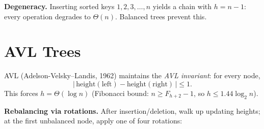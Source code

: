 \textbf{Degeneracy.} Inserting sorted keys $1,2,3,\ldots,n$ yields a chain with $h=n-1$: every operation degrades to $\Theta(n)$. Balanced trees prevent this.

\section{AVL Trees}
\label{sec:avl}
AVL (Adelson-Velsky--Landis, 1962) maintains the \emph{AVL invariant}: for every node,
\begin{equation}
|\,\text{height}(\text{left}) - \text{height}(\text{right})\,| \le 1.
\label{eq:avl-invariant}
\end{equation}
This forces $h=\Theta(\log n)$ (Fibonacci bound: $n\ge F_{h+2}-1$, so $h\le1.44\log_{2}n$).

\textbf{Rebalancing via rotations.} After insertion/deletion, walk up updating heights; at the first unbalanced node, apply one of four rotations:

